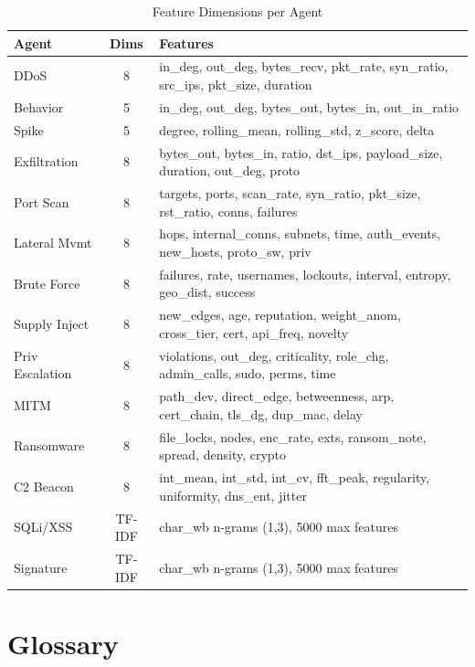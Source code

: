 \documentclass[12pt, a4paper]{report}
\begin{document}
\begin{table}[H]
\centering
\caption{Feature Dimensions per Agent}
\small
\begin{tabular}{l c l}
\toprule
\textbf{Agent} & \textbf{Dims} & \textbf{Features} \\
\midrule
DDoS & 8 & in\_deg, out\_deg, bytes\_recv, pkt\_rate, syn\_ratio, src\_ips, pkt\_size, duration \\
Behavior & 5 & in\_deg, out\_deg, bytes\_out, bytes\_in, out\_in\_ratio \\
Spike & 5 & degree, rolling\_mean, rolling\_std, z\_score, delta \\
Exfiltration & 8 & bytes\_out, bytes\_in, ratio, dst\_ips, payload\_size, duration, out\_deg, proto \\
Port Scan & 8 & targets, ports, scan\_rate, syn\_ratio, pkt\_size, rst\_ratio, conns, failures \\
Lateral Mvmt & 8 & hops, internal\_conns, subnets, time, auth\_events, new\_hosts, proto\_sw, priv \\
Brute Force & 8 & failures, rate, usernames, lockouts, interval, entropy, geo\_dist, success \\
Supply Inject & 8 & new\_edges, age, reputation, weight\_anom, cross\_tier, cert, api\_freq, novelty \\
Priv Escalation & 8 & violations, out\_deg, criticality, role\_chg, admin\_calls, sudo, perms, time \\
MITM & 8 & path\_dev, direct\_edge, betweenness, arp, cert\_chain, tls\_dg, dup\_mac, delay \\
Ransomware & 8 & file\_locks, nodes, enc\_rate, exts, ransom\_note, spread, density, crypto \\
C2 Beacon & 8 & int\_mean, int\_std, int\_cv, fft\_peak, regularity, uniformity, dns\_ent, jitter \\
SQLi/XSS & TF-IDF & char\_wb n-grams (1,3), 5000 max features \\
Signature & TF-IDF & char\_wb n-grams (1,3), 5000 max features \\
\bottomrule
\end{tabular}
\end{table}

\chapter{Glossary}
\end{document}
